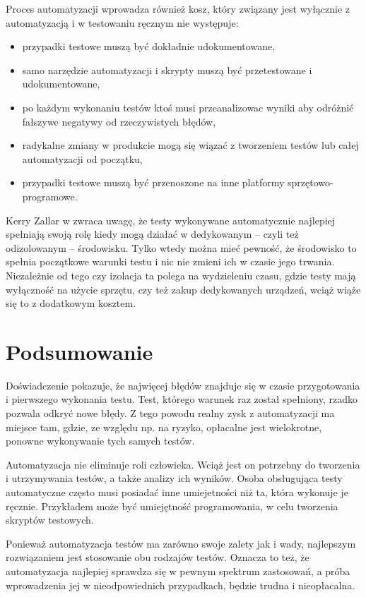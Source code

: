 \documentclass[00-praca-magisterska.tex]{subfiles}
\begin{document}
Proces automatyzacji wprowadza również kosz, który związany jest wyłącznie z
automatyzacją i w testowaniu ręcznym nie występuje:
\begin{itemize}
\item przypadki testowe muszą być dokładnie udokumentowane,
\item samo narzędzie automatyzacji i skrypty muszą być przetestowane i udokumentowane,
\item po każdym wykonaniu testów ktoś musi przeanalizowac wyniki aby odróżnić
fałszywe negatywy od rzeczywistych błędów,
\item radykalne zmiany w produkcie mogą się wiązać z tworzeniem testów lub całej automatyzacji od początku,
\item przypadki testowe muszą być przenoszone na inne platformy sprzętowo-programowe.
\end{itemize}

Kerry Zallar w \cite{practical-automated} zwraca uwagę, że testy wykonywane
automatycznie najlepiej spełniają swoją rolę kiedy mogą działać w dedykowanym
-- czyli też odizolowanym -- środowisku. Tylko wtedy można mieć pewność, że
środowisko to spełnia początkowe warunki testu i nic nie zmieni ich w czasie
jego trwania. Niezależnie od tego czy izolacja ta polega na wydzieleniu czasu,
gdzie testy mają wyłączność na użycie sprzętu, czy też zakup dedykowanych
urządzeń, wciąż wiąże się to z dodatkowym kosztem.

\section{Podsumowanie}

Doświadczenie pokazuje, że najwięcej błędów znajduje się w czasie przygotowania
i pierwszego wykonania testu. Test, którego warunek raz został spełniony,
rzadko pozwala odkryć nowe błędy. Z tego powodu realny zysk z automatyzacji ma
miejsce tam, gdzie, ze względu np. na ryzyko, opłacalne jest wielokrotne,
ponowne wykonywanie tych samych testów.

Automatyzacja nie eliminuje roli człowieka. Wciąż jest on potrzebny do
tworzenia i utrzymywania testów, a także analizy ich wyników. Osoba obsługująca
testy automatyczne często musi posiadać inne umiejetności niż ta, która
wykonuje je ręcznie. Przykładem może być umiejętność programowania, w celu
tworzenia skryptów testowych.

Ponieważ automatyzacja testów ma zarówno swoje zalety jak i wady, najlepszym
rozwiązaniem jest stosowanie obu rodzajów testów. Oznacza to też, że
automatyzacja najlepiej sprawdza się w pewnym spektrum zastosowań, a próba
wprowadzenia jej w nieodpowiednich przypadkach, będzie trudna i nieopłacalna.
\end{document}
